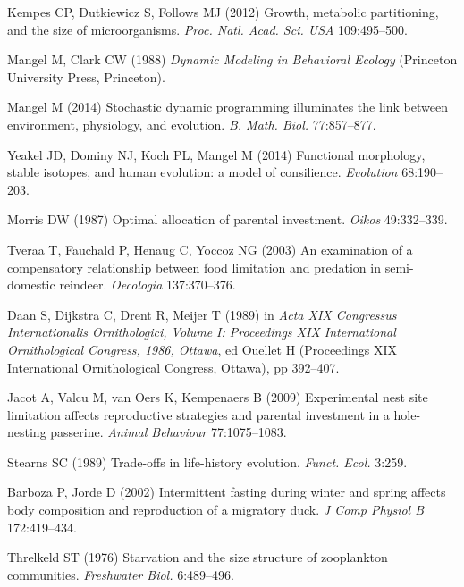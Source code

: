 \documentclass{pnastwo}
\begin{document}
\begin{article}
{\begin{thebibliography}{10}
Kempes CP, Dutkiewicz S, Follows MJ
\newblock (2012) {Growth, metabolic partitioning, and the size of
  microorganisms}.
\newblock \emph{Proc. Natl. Acad. Sci. USA} 109:495--500.

Mangel M, Clark CW
\newblock (1988) \emph{{Dynamic Modeling in Behavioral Ecology}}
\newblock (Princeton University Press, Princeton).

Mangel M
\newblock (2014) {Stochastic dynamic programming illuminates the link between
  environment, physiology, and evolution}.
\newblock \emph{B. Math. Biol.} 77:857--877.

Yeakel JD, Dominy NJ, Koch PL, Mangel M
\newblock (2014) {Functional morphology, stable isotopes, and human evolution:
  a model of consilience}.
\newblock \emph{Evolution} 68:190--203.

Morris DW
\newblock (1987) {Optimal allocation of parental investment}.
\newblock \emph{Oikos} 49:332--339.

Tveraa T, Fauchald P, Henaug C, Yoccoz NG
\newblock (2003) {An examination of a compensatory relationship between food
  limitation and predation in semi-domestic reindeer}.
\newblock \emph{Oecologia} 137:370--376.

Daan S, Dijkstra C, Drent R, Meijer T
\newblock (1989) in \emph{Acta XIX Congressus Internationalis Ornithologici,
  Volume I: Proceedings XIX International Ornithological Congress, 1986,
  Ottawa}, ed{} Ouellet H
\newblock (Proceedings XIX International Ornithological Congress, Ottawa), pp
  392--407.

Jacot A, Valcu M, van Oers K, Kempenaers B
\newblock (2009) {Experimental nest site limitation affects reproductive
  strategies and parental investment in a hole-nesting passerine}.
\newblock \emph{Animal Behaviour} 77:1075--1083.

Stearns SC
\newblock (1989) {Trade-offs in life-history evolution}.
\newblock \emph{Funct. Ecol.} 3:259.

Barboza P, Jorde D
\newblock (2002) {Intermittent fasting during winter and spring affects body
  composition and reproduction of a migratory duck}.
\newblock \emph{J Comp Physiol B} 172:419--434.

Threlkeld ST
\newblock (1976) {Starvation and the size structure of zooplankton
  communities}.
\newblock \emph{Freshwater Biol.} 6:489--496.


\end{thebibliography}}
\end{article}
\end{document}
